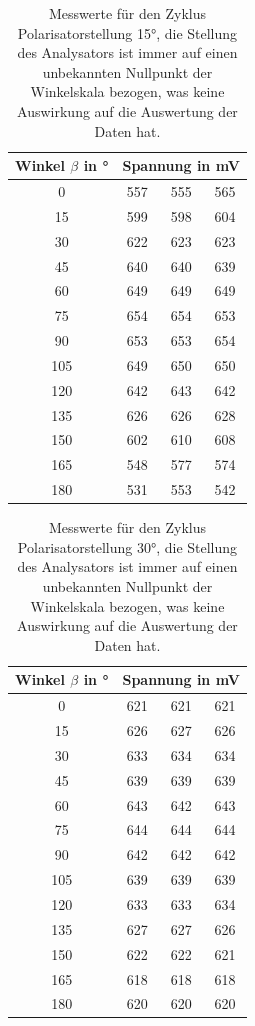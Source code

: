 \documentclass[a4paper, 12pt,]{scrartcl}
\begin{document}
\begin{table}[H]\centering\begin{tabular}{c |ccc}Winkel $\beta$ in °&\multicolumn{3}{c}{Spannung in mV}\\\hline
0&	557	&555	&565\\
15&	599	&598	&604\\
30	&622	&623	&623\\
45	&640	&640	&639\\
60	&649	&649	&649\\
75	&654	&654	&653\\
90	&653	&653	&654\\
105	&649	&650	&650\\
120	&642	&643	&642\\
135	&626&626	&628\\
150	&602	&610	&608\\
165	&548	&577	&574\\
180	&531	&553	&542
\end{tabular}\caption{Messwerte für den Zyklus Polarisatorstellung 15°, die Stellung des Analysators ist immer auf einen unbekannten Nullpunkt der Winkelskala bezogen, was keine Auswirkung auf die Auswertung der Daten hat.}\end{table}



\begin{table}[H]\centering\begin{tabular}{c |ccc}Winkel $\beta$ in °&\multicolumn{3}{c}{Spannung in mV}\\\hline
0	&621	&621	&621\\
15	&626	&627	&626\\
30	&633	&634	&634\\
45	&639	&639	&639\\
60	&643	&642	&643\\
75&	644	&644	&644\\
90	&642	&642	&642\\
105	&639	&639	&639\\
120	&633	&633	&634\\
135	&627	&627	&626\\
150	&622	&622	&621\\
165	&618&	618	&618\\
180	&620	&620	&620    
\end{tabular}\caption{Messwerte für den Zyklus Polarisatorstellung 30°, die Stellung des Analysators ist immer auf einen unbekannten Nullpunkt der Winkelskala bezogen, was keine Auswirkung auf die Auswertung der Daten hat.}\end{table}
\end{document}
